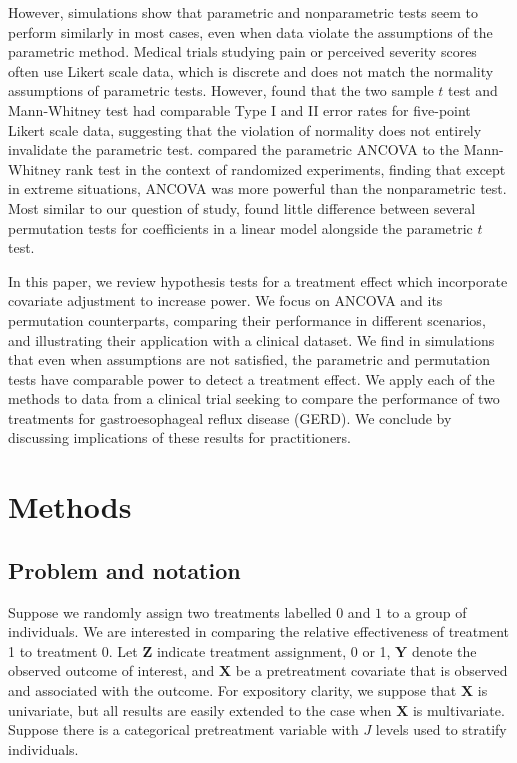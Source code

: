 \documentclass[11pt]{article}
\newcommand{\todo}[1]{{\color{red}{TO DO: \sc #1}}}
\begin{document}
However, simulations show that parametric and nonparametric tests seem to perform similarly in most cases, even when data violate the assumptions of the parametric method.
Medical trials studying pain or perceived severity scores often use Likert scale data, which is discrete and does not match the normality assumptions of parametric tests.
However, \cite{winter_five-point_2010} found that the two sample $t$ test and Mann-Whitney test had comparable Type I and II error rates for five-point Likert scale data, suggesting that the violation of normality does not entirely invalidate the parametric test.
\cite{vickers_parametric_2005} compared the parametric ANCOVA to the Mann-Whitney rank test in the context of randomized experiments, finding that except in extreme situations, ANCOVA was more powerful than the nonparametric test.
Most similar to our question of study, \cite{anderson_empirical_1999} found little difference between several permutation tests for coefficients in a linear model alongside the parametric $t$ test.

In this paper, we review hypothesis tests for a treatment effect which incorporate covariate adjustment to increase power.  
We focus on ANCOVA and its permutation counterparts, comparing their performance in different scenarios, and illustrating their application with a clinical dataset.
We find in simulations that even when assumptions are not satisfied, the parametric and permutation tests have comparable power to detect a treatment effect.
We apply each of the methods to data from a clinical trial seeking to compare the performance of two treatments for gastroesophageal reflux disease (GERD).
We conclude by discussing implications of these results for practitioners.

\section*{Methods}


\subsection*{Problem and notation \todo{what do others call this?}}
Suppose we randomly assign two treatments labelled $0$ and $1$ to a group of individuals.
We are interested in comparing the relative effectiveness of treatment 1 to treatment 0.
Let $\mathbf{Z}$ indicate treatment assignment, 0 or 1, 
$\mathbf{Y}$ denote the observed outcome of interest,
and $\mathbf{X}$ be a pretreatment covariate that is observed and associated with the outcome.
For expository clarity, we suppose that $\mathbf{X}$ is univariate, but all results are easily extended to the case when $\mathbf{X}$ is multivariate.
Suppose there is a categorical pretreatment variable with $J$ levels used to stratify individuals. 
\end{document}
